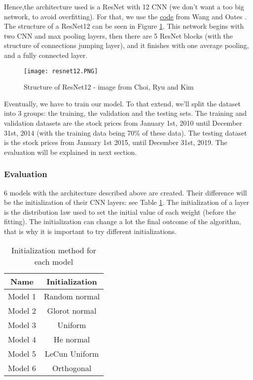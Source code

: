 \documentclass[11pt]{article}
\begin{document}
\begin{onehalfspace}
Hence,the architecture used is a ResNet with 12 CNN (we don't want a too big network, to avoid overfitting). For that, we use the \href{https://github.com/cauchyturing/UCR_Time_Series_Classification_Deep_Learning_Baseline/blob/master/ResNet.py}{code} from Wang and Oates \cite{wang}. The structure of a ResNet12 can be seen in Figure \ref{fig:resnet12}. This network begins with two CNN and max pooling layers, then there are 5 ResNet blocks (with the structure of connections jumping layer), and it finishes with one average pooling, and a fully connected layer.

\begin{figure}[h!]
     \centering
     \captionsetup{justification=centering}
     \texttt{[image: resnet12.PNG]}
     \caption{Structure of ResNet12 - image from Choi, Ryu and Kim \cite{choi}}
\label{fig:resnet12}
\end{figure}

Eventually, we have to train our model. To that extend, we'll split the dataset into 3 groups: the training, the validation and the testing sets. The training and validation datasets are the stock prices from January 1st, 2010 until December 31st, 2014 (with the training data being 70\% of these data). The testing dataset is the stock prices from January 1st 2015, until December 31st, 2019. The evaluation will be explained in next section.


\subsubsection{Evaluation}
\label{sec:meth_eval}

6 models with the architecture described above are created. Their difference will be the initialization of their CNN layers: see Table \ref{table:initialization}. The initialization of a layer is the distribution law used to set the initial value of each weight (before the fitting). The initialization can change a lot the final outcome of the algorithm, that is why it is important to try different initializations.

\begin{table}[h!]
    \begin{center}
        \begin{tabular}{ | c | c |}
            \hline
            \textbf{Name} & \textbf{Initialization} \\ 
            \hline \hline
            Model 1 & Random normal \\  \hline
            Model 2 & Glorot normal \\  \hline
            Model 3 & Uniform \\  \hline
            Model 4 & He normal \\  \hline
            Model 5 & LeCun Uniform \\  \hline
            Model 6 & Orthogonal \\  
            \hline
        \end{tabular}
    \end{center}
    \caption{Initialization method for each model}
    \label{table:initialization}
\end{table}


\end{onehalfspace}
\end{document}

